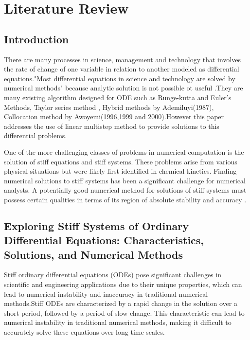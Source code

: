 \raggedbottom
\chapter{Literature Review}

\section{Introduction}
There are many processes in science, management and technology that involves the rate of change of one variable in relation to another modeled as differential equations."Most differential equations in science and technology are solved by numerical methods"\cite{ross} because analytic solution is not possible ot useful \cite{lambert1977}.They are many existing algorithm designed for ODE such as Runge-kutta and Euler's Methods, Taylor series method \cite{lambert1977}, Hybrid methods by Ademiluyi(1987), Collocation method by Awoyemi(1996,1999 and 2000).However this paper addresses the use of linear multistep method to provide solutions to this differential problems.


One of the more challenging classes of problems in numerical computation is the solution of stiff equations and stiff systems. These problems arise from various physical situations but were likely first identified in chemical kinetics. Finding numerical solutions to stiff systems has been a significant challenge for numerical analysts. A potentially good numerical method for solutions of stiff systems must possess certain qualities in terms of its region of absolute stability and accuracy \cite{QURESH2024}.




\section{Exploring Stiff Systems of Ordinary Differential Equations: Characteristics, Solutions, and Numerical Methods}

Stiff ordinary differential equations (ODEs) pose significant challenges in scientific and engineering applications due to their unique properties, which can lead to numerical instability and inaccuracy in traditional numerical methods.Stiff ODEs are characterized by a rapid change in the solution over a short period, followed by a period of slow change. This characteristic can lead to numerical instability in traditional numerical methods, making it difficult to accurately solve these equations over long time scales.

